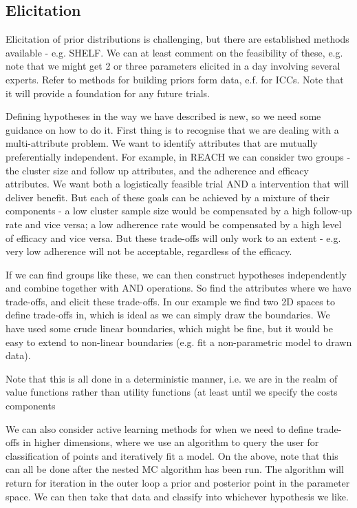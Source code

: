 \documentclass{article} %
\begin{document}
\subsection{Elicitation}

Elicitation of prior distributions is challenging, but there are established methods available - e.g. SHELF. We can at least comment on the feasibility of these, e.g. note that we might get 2 or three parameters elicited in a day involving several experts. Refer to methods for building priors form data, e.f. for ICCs. Note that it will provide a foundation for any future trials.

Defining hypotheses in the way we have described is new, so we need some guidance on how to do it. First thing is to recognise that we are dealing with a multi-attribute problem. We want to identify attributes that are mutually preferentially independent. For example, in REACH we can consider two groups - the cluster size and follow up attributes, and the adherence and efficacy attributes. We want both a logistically feasible trial AND a intervention that will deliver benefit. But each of these goals can be achieved by a mixture of their components - a low cluster sample size would be compensated by a high follow-up rate and vice versa; a low adherence rate would be compensated by a high level of efficacy and vice versa. But these trade-offs will only work to an extent - e.g. very low adherence will not be acceptable, regardless of the efficacy. 

If we can find groups like these, we can then construct hypotheses independently and combine together with AND operations. So find the attributes where we have trade-offs, and elicit these trade-offs. In our example we find two 2D spaces to define trade-offs in, which is ideal as we can simply draw the boundaries. We have used some crude linear boundaries, which might be fine, but it would be easy to extend to non-linear boundaries (e.g. fit a non-parametric model to drawn data). 

Note that this is all done in a deterministic manner, i.e. we are in the realm of value functions rather than utility functions (at least until we specify the costs components

We can also consider active learning methods for when we need to define trade-offs in higher dimensions, where we use an algorithm to query the user for classification of points and iteratively fit a model. 
On the above, note that this can all be done after the nested MC algorithm has been run. The algorithm will return for iteration in the outer loop a prior and posterior point in the parameter space. We can then take that data and classify into whichever hypothesis we like. 
\end{document}
